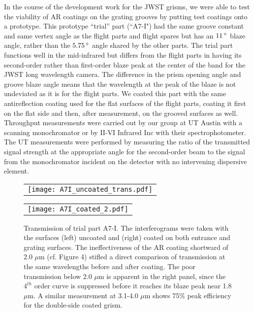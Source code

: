 In the course of the development work for the JWST grisms, we were able to test the viability of AR coatings on the grating grooves by putting test coatings onto a prototype.  This prototype ``trial'' part (``A7-I") had the same groove constant and same vertex angle as the flight parts and flight spares but has an $11\,^{\circ}{\rm}$ blaze angle, rather than the $5.75\,^{\circ}{\rm}$ angle shared by the other parts.  The trial part functions well in the mid-infrared but differs from the flight parts in having its second-order rather than first-order blaze peak at the center of the band for the JWST long wavelength camera.  The difference in the prism opening angle and groove blaze angle means that the wavelength at the peak of the blaze is not undeviated as it is for the flight parts.  We coated this part with the same antireflection coating used for the flat surfaces of the flight parts, coating it first on the flat side and then, after measurement, on the grooved surfaces as well.  Throughput measurements were carried out by our group at UT Austin with a scanning monochromator or by II-VI Infrared Inc with their spectrophotometer.  The UT measurements were performed by measuring the ratio of the transmitted signal strength at the appropriate angle for the second-order beam to the signal from the monochromator incident on the detector with no intervening dispersive element.

   \begin{figure}
   \begin{minipage}[b]{0.5\linewidth} %
   \begin{tabular}{c}
   \texttt{[image: A7I\_uncoated\_trans.pdf]}
   \end{tabular}
   \end{minipage}
   \hspace{0.01cm} %
\begin{minipage}[b]{0.5\linewidth}
   \begin{tabular}{c}
   \texttt{[image: A7I\_coated\_2.pdf]}
   \end{tabular}
   \end{minipage}
   \caption[JWST grism transmission] {\label{fig:im5}  Transmission of trial part A7-I.  The interferograms were taken with the surfaces (left) uncoated and (right) coated on both entrance and grating surfaces.  The ineffectiveness of the AR coating shortward of 2.0 $\mu$m (cf. Figure 4) stifled a direct comparison of transmission at the same wavelengths before and after coating.  The poor transmission below 2.0 $\mu$m is apparent in the right panel, since the $4^{th}$ order curve is suppressed before it reaches its blaze peak near 1.8 $\mu$m.  A similar measurement at 3.1-4.0 $\mu$m shows 75\% peak efficiency for the double-side coated grism.}
   \end{figure} 


